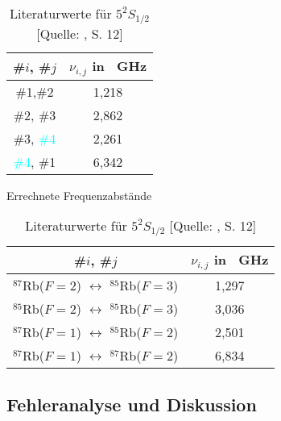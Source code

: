 \begin{table}[!h]
\begin{minipage}{7cm}
    \centering
    \begin{tabular}{|c|c|}
        \hline
        \#$i$, \#$j$       &       $\nu_{i,j}$ in \SI{}{\giga \hertz}      \\ 
        \hline
        \hline
        \textcolor{red!80!black}{\#1},\textcolor{green!50!black}{\#2}       &       1,218        \\  
        \hline
        \textcolor{green!50!black}{\#2}, \textcolor{pink!50!purple}{\#3}    &       2,862        \\ 
        \hline
        \textcolor{pink!50!purple}{\#3}, \textcolor{cyan}{\#4}              &       2,261        \\ 
        \hline
        \textcolor{cyan}{\#4}, \textcolor{red!80!black}{\#1}                &       6,342        \\ 
        \hline
    \end{tabular}
    \caption{Errechnete Frequenzabstände}
    \label{tab:plot-data00-rubidium}
\end{minipage}
\hskip0.5cm
\begin{minipage}{7cm}
    \begin{tabular}{|c|c|}
        \hline
        \#$i$, \#$j$       &       $\nu_{i,j}$ in \SI{}{\giga \hertz}      \\ 
        \hline
        \hline
        $^{87}$Rb($F = 2$) $\longleftrightarrow$ $^{85}$Rb($F = 3$)         &       1,297           \\  
        \hline
        $^{85}$Rb($F = 2$) $\longleftrightarrow$ $^{85}$Rb($F = 3$)         &       3,036           \\ 
        \hline
        $^{87}$Rb($F = 1$) $\longleftrightarrow$ $^{85}$Rb($F = 2$)         &       2,501           \\ 
        \hline
        $^{87}$Rb($F = 1$) $\longleftrightarrow$ $^{87}$Rb($F = 2$)         &       6,834           \\ 
        \hline
    \end{tabular}
    \caption{Literaturwerte für $5^{2}S_{1/2}$ [Quelle: \cite{H2}, S. 12]}
    \label{tab:lit-plot-data00-rubidium}
\end{minipage}
\end{table}


\subsection{Fehleranalyse und Diskussion}

